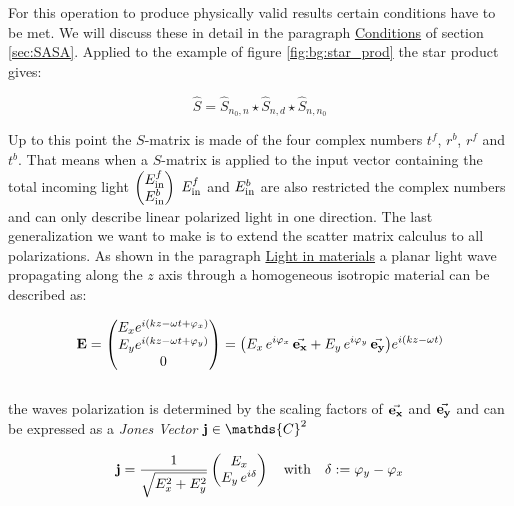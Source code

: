 For this operation to produce physically valid results certain conditions have to be met. We will discuss these in detail in the paragraph \hyperref[par:conditions]{Conditions} of section \ref{sec:SASA}.
Applied to the example of figure \ref{fig:bg:star_prod} the star product gives:

\begin{equation}
    \hat S = \hat S_{n_0, n} \star \hat S_{n, d} \star \hat S_{n, n_0}
\end{equation}

Up to this point the $S$-matrix is made of the four complex numbers $t^f$, $r^b$, $r^f$ and $t^b$. That means when a $S$-matrix is applied to the input vector containing the total incoming light  
$
\begin{pmatrix}
    E^f_{\mathrm{in}} \\
    E^b_{\mathrm{in}}
\end{pmatrix}
$
$E^f_{\mathrm{in}}$ and $E^b_{\mathrm{in}}$ are also restricted the complex numbers and can only describe linear polarized light in one direction. The last generalization we want to make is to extend the scatter matrix calculus to all polarizations. As shown in the paragraph \hyperref[par:light_in_materials]{Light in materials} a planar light wave propagating along the $z$ axis through a homogeneous isotropic material can be described as:

\begin{equation}
   \vb E =
   \begin{pmatrix}
       E_x e^{i(kz - \omega t + \varphi_x)}\\
       E_y e^{i(kz - \omega t + \varphi_y)}\\
       0\\
   \end{pmatrix}
   =
   \qty(E_x \, e^{i \varphi_x} \, \va{e_x} +
        E_y \, e^{i \varphi_y} \, \va{e_y})
       e^{i(kz - \omega t)}
\end{equation}
\\

\noindent
the waves polarization is determined by the scaling factors of $\va{e_x}$ and $\va{e_y}$ and can be expressed as a \textit{Jones Vector} $\vb j \in \mathds{C}^2$

\begin{equation}
   \vb j = \frac{1}{\sqrt{E_x^2 + E_y^2}}
   \begin{pmatrix}
       E_x\\
       E_y \, e^{i \delta}
   \end{pmatrix}
   \qq{with}
   \delta := \varphi_y - \varphi_x
\end{equation}

